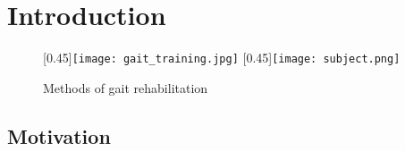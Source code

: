\chapter{Introduction}

%
%
\begin{figure}
	\centering
	[0.45\textwidth]{\texttt{[image: gait\_training.jpg]}}%
	\hfill
	[0.45\textwidth]{\texttt{[image: subject.png]}}%
	\vspace{-0.75em}
	\caption{Methods of gait rehabilitation}
	\vspace{-1em}
\end{figure}

\section{Motivation}
%

